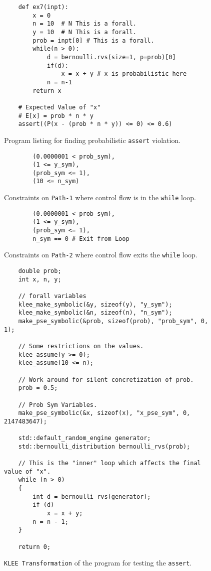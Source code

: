 \documentclass[usenames,dvipsnames,acmsmall]{acmart}
\begin{document}
	\begin{figure}
		\begin{verbatim}
	def ex7(inpt):
		x = 0
		n = 10  # N This is a forall.
		y = 10  # N This is a forall.
		prob = inpt[0] # This is a forall. 
		while(n > 0):
			d = bernoulli.rvs(size=1, p=prob)[0]
			if(d): 
				x = x + y # x is probabilistic here
			n = n-1
		return x
	
	# Expected Value of "x"
	# E[x] = prob * n * y
	assert((P(x - (prob * n * y)) <= 0) <= 0.6)
		\end{verbatim}
		\caption{Program listing for finding probabilistic \texttt{assert} violation.}
	\end{figure}
	\begin{figure}
	\begin{verbatim}
		(0.0000001 < prob_sym),
		(1 <= y_sym),
		(prob_sym <= 1),
		(10 <= n_sym)
	\end{verbatim}
	\caption{Constraints on \texttt{Path-1} where control flow is in the \texttt{while} loop.}
	\end{figure}
	\begin{figure}
		\begin{verbatim}
		(0.0000001 < prob_sym),
		(1 <= y_sym),
		(prob_sym <= 1),
		n_sym == 0 # Exit from Loop
		\end{verbatim}
		\caption{Constraints on \texttt{Path-2} where control flow exits the \texttt{while} loop.}
	\end{figure}
\begin{figure}
	\begin{verbatim}
	double prob;
	int x, n, y;
	
	// forall variables
	klee_make_symbolic(&y, sizeof(y), "y_sym");
	klee_make_symbolic(&n, sizeof(n), "n_sym");
	make_pse_symbolic(&prob, sizeof(prob), "prob_sym", 0, 1);
	
	// Some restrictions on the values.
	klee_assume(y >= 0);
	klee_assume(10 <= n);
	
	// Work around for silent concretization of prob.
	prob = 0.5;
	
	// Prob Sym Variables.
	make_pse_symbolic(&x, sizeof(x), "x_pse_sym", 0, 2147483647);
	
	std::default_random_engine generator;
	std::bernoulli_distribution bernoulli_rvs(prob);
	
	// This is the "inner" loop which affects the final value of "x".
	while (n > 0)
	{
		int d = bernoulli_rvs(generator);
		if (d)
			x = x + y;
		n = n - 1;
	}

	return 0;
	\end{verbatim}
	\caption{\texttt{KLEE Transformation} of the program for testing the \texttt{assert}. }
\end{figure}
\end{document}
